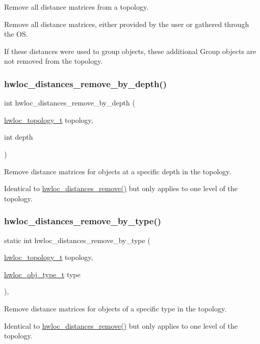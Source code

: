 Remove all distance matrices from a topology. 

Remove all distance matrices, either provided by the user or gathered through the OS.

If these distances were used to group objects, these additional Group objects are not removed from the topology. \mbox{\label{a00210_gaa642a4c1a21c84f38ae23fca8a27845d}} 
\subsubsection{\texorpdfstring{hwloc\+\_\+distances\+\_\+remove\+\_\+by\+\_\+depth()}{hwloc\_distances\_remove\_by\_depth()}}
{\footnotesize\ttfamily int hwloc\+\_\+distances\+\_\+remove\+\_\+by\+\_\+depth (\begin{DoxyParamCaption}\item[{\hyperlink{a00186_ga9d1e76ee15a7dee158b786c30b6a6e38}{hwloc\+\_\+topology\+\_\+t}}]{topology,  }\item[{int}]{depth }\end{DoxyParamCaption})}



Remove distance matrices for objects at a specific depth in the topology. 

Identical to \hyperlink{a00210_gac188d9b64d9560255ce5f6d0a20f9c0a}{hwloc\+\_\+distances\+\_\+remove()} but only applies to one level of the topology. \mbox{\label{a00210_ga93db53773c96f5b83815e8441e2ebb93}} 
\subsubsection{\texorpdfstring{hwloc\+\_\+distances\+\_\+remove\+\_\+by\+\_\+type()}{hwloc\_distances\_remove\_by\_type()}}
{\footnotesize\ttfamily static int hwloc\+\_\+distances\+\_\+remove\+\_\+by\+\_\+type (\begin{DoxyParamCaption}\item[{\hyperlink{a00186_ga9d1e76ee15a7dee158b786c30b6a6e38}{hwloc\+\_\+topology\+\_\+t}}]{topology,  }\item[{\hyperlink{a00184_gacd37bb612667dc437d66bfb175a8dc55}{hwloc\+\_\+obj\+\_\+type\+\_\+t}}]{type }\end{DoxyParamCaption})\hspace{0.3cm}{\ttfamily [inline]}, {\ttfamily [static]}}



Remove distance matrices for objects of a specific type in the topology. 

Identical to \hyperlink{a00210_gac188d9b64d9560255ce5f6d0a20f9c0a}{hwloc\+\_\+distances\+\_\+remove()} but only applies to one level of the topology. 